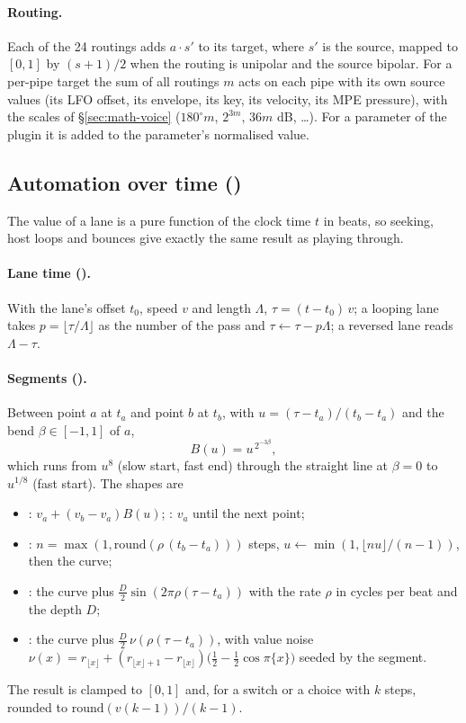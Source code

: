 \paragraph{Routing.} Each of the 24 routings adds $a\cdot s'$ to its target, where $s'$ is the source, mapped to $[0,1]$
by $(s+1)/2$ when the routing is unipolar and the source bipolar. For a per-pipe target the sum of all routings $m$ acts
on each pipe with its own source values (its LFO offset, its envelope, its key, its velocity, its MPE pressure), with the
scales of \S\ref{sec:math-voice} ($180^\circ m$, $2^{3m}$, $36m$ dB, \dots). For a parameter of the plugin it is added
to the parameter's normalised value.

\subsection{Automation over time ()}
\label{sec:math-verlauf}
The value of a lane is a pure function of the clock time $t$ in beats, so seeking, host loops and bounces give exactly
the same result as playing through.

\paragraph{Lane time ().} With the lane's offset $t_0$, speed $v$ and length $\Lambda$,
$\tau = (t-t_0)\,v$; a looping lane takes $p = \lfloor\tau/\Lambda\rfloor$ as the number of the pass and
$\tau \leftarrow \tau - p\Lambda$; a reversed lane reads $\Lambda - \tau$.

\paragraph{Segments ().} Between point $a$ at $t_a$ and point $b$ at $t_b$, with $u = (\tau-t_a)/(t_b-t_a)$
and the bend $\beta\in[-1,1]$ of $a$,
\begin{equation}
  B(u) = u^{\,2^{-3\beta}},
\end{equation}
which runs from $u^8$ (slow start, fast end) through the straight line at $\beta=0$ to $u^{1/8}$ (fast start). The
shapes are
\begin{itemize}[nosep]
  \item {}: $v_a + (v_b-v_a)B(u)$; : $v_a$ until the next point;
  \item {}: $n = \max(1,\mathrm{round}(\rho\,(t_b-t_a)))$ steps, $u\leftarrow\min(1, \lfloor nu\rfloor/(n-1))$, then the curve;
  \item {}: the curve plus $\tfrac D2\sin(2\pi\rho(\tau-t_a))$ with the rate $\rho$ in cycles per beat and the depth $D$;
  \item {}: the curve plus $\tfrac D2\,\nu(\rho(\tau-t_a))$, with value noise
    $\nu(x) = r_{\lfloor x\rfloor} + (r_{\lfloor x\rfloor+1}-r_{\lfloor x\rfloor})\bigl(\tfrac12-\tfrac12\cos\pi\{x\}\bigr)$ seeded by the segment.
\end{itemize}
The result is clamped to $[0,1]$ and, for a switch or a choice with $k$ steps, rounded to $\mathrm{round}(v(k-1))/(k-1)$.


